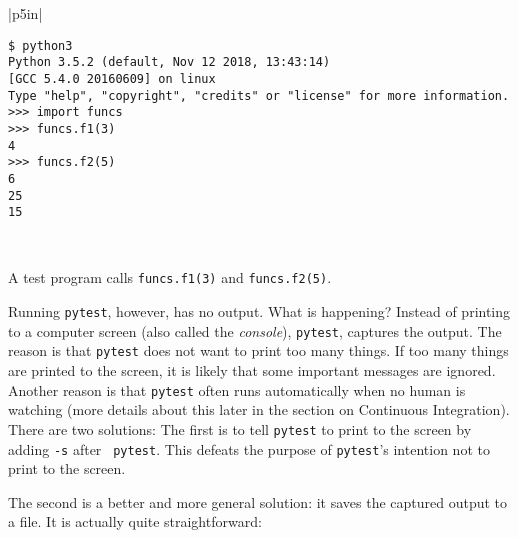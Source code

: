 \vspace{0.2in}

\noindent
\begin{tabular}{|p{5in}|}\hline
\begin{verbatim}
$ python3
Python 3.5.2 (default, Nov 12 2018, 13:43:14) 
[GCC 5.4.0 20160609] on linux
Type "help", "copyright", "credits" or "license" for more information.
>>> import funcs
>>> funcs.f1(3)
4
>>> funcs.f2(5)
6
25
15
\end{verbatim}
\\ \hline
\end{tabular}
\vspace{0.2in}

A test program calls {\tt funcs.f1(3)} and {\tt funcs.f2(5)}.

\resetlinenumber[1]
\linenumbers
\begin{tt}
  
\end{tt}
\nolinenumbers

Running {\tt pytest}, however, has no output. What is happening?
Instead of printing to a computer screen (also called the {\it
  console}), {\tt pytest}, captures the output.  The reason is that
{\tt pytest} does not want to print too many things.  If too many
things are printed to the screen, it is likely that some important
messages are ignored. Another reason is that {\tt pytest} often runs
automatically when no human is watching (more details about this
later in the section on Continuous Integration).
There are two solutions: The first is to tell
{\tt pytest} to print to the screen by adding {\tt -s} after {\tt
  pytest}.  This defeats the purpose of {\tt pytest}'s intention not
to print to the screen.


The second is a better and more general solution: it saves the
captured output to a file. It is actually quite straightforward:

\resetlinenumber[1]
\linenumbers
\begin{tt}
  
\end{tt}
\nolinenumbers


